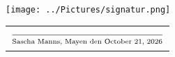 \documentclass[a4paper]{friggeri-cv} %
\begin{document}


\begin{center}
\texttt{[image: ../Pictures/signatur.png]} \\
\begin{tabular}{@{}l@{}}
\\ $\frac{}{\strut\textnormal{Sascha Manns, Mayen den \today}}$
\end{tabular}
\end{center}

\end{document}
